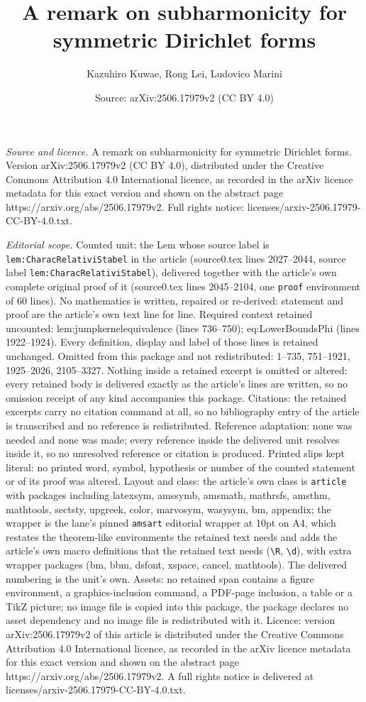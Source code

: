 \documentclass[10pt,a4paper]{amsart}
\title[A remark on subharmonicity for symmetric Dirichlet forms]{A remark on subharmonicity for symmetric Dirichlet forms}
\author{Kazuhiro Kuwae, Rong Lei, Ludovico Marini}
\date{Source: arXiv:2506.17979v2 (CC BY 4.0)}
\begin{document}
\maketitle

\noindent\emph{Source and licence.} A remark on subharmonicity for symmetric Dirichlet forms. Version arXiv:2506.17979v2 (CC BY 4.0), distributed under the Creative Commons Attribution 4.0 International licence, as recorded in the arXiv licence metadata for this exact version and shown on the abstract page https://arxiv.org/abs/2506.17979v2. Full rights notice: licenses/arxiv-2506.17979-CC-BY-4.0.txt.\par\smallskip

\noindent\textit{Editorial scope.} Counted unit: the Lem whose source label is \texttt{lem:CharacRelativiStabel} in the article (source0.tex lines 2027--2044, source label \texttt{lem:CharacRelativiStabel}), delivered together with the article's own complete original proof of it (source0.tex lines 2045--2104, one \texttt{proof} environment of 60 lines). No mathematics is written, repaired or re-derived: statement and proof are the article's own text line for line. Required context retained uncounted: lem:jumpkernelequivalence (lines 736--750); eq:LowerBoundsPhi (lines 1922--1924). Every definition, display and label of those lines is retained unchanged. Omitted from this package and not redistributed: 1--735, 751--1921, 1925--2026, 2105--3327. Nothing inside a retained excerpt is omitted or altered: every retained body is delivered exactly as the article's lines are written, so no omission receipt of any kind accompanies this package. Citations: the retained excerpts carry no citation command at all, so no bibliography entry of the article is transcribed and no reference is redistributed. Reference adaptation: none was needed and none was made; every reference inside the delivered unit resolves inside it, so no unresolved reference or citation is produced. Printed slips kept literal: no printed word, symbol, hypothesis or number of the counted statement or of its proof was altered. Layout and class: the article's own class is \texttt{article} with packages including latexsym, amssymb, amsmath, mathrsfs, amsthm, mathtools, sectsty, upgreek, color, marvosym, wasysym, bm, appendix; the wrapper is the lane's pinned \texttt{amsart} editorial wrapper at 10pt on A4, which restates the theorem-like environments the retained text needs and adds the article's own macro definitions that the retained text needs (\texttt{\textbackslash R}, \texttt{\textbackslash d}), with extra wrapper packages (bm, bbm, dsfont, xspace, cancel, mathtools). The delivered numbering is the unit's own. Assets: no retained span contains a figure environment, a graphics-inclusion command, a PDF-page inclusion, a table or a TikZ picture; no image file is copied into this package, the package declares no asset dependency and no image file is redistributed with it. Licence: version arXiv:2506.17979v2 of this article is distributed under the Creative Commons Attribution 4.0 International licence, as recorded in the arXiv licence metadata for this exact version and shown on the abstract page https://arxiv.org/abs/2506.17979v2. A full rights notice is delivered at licenses/arxiv-2506.17979-CC-BY-4.0.txt. 
\end{document}
